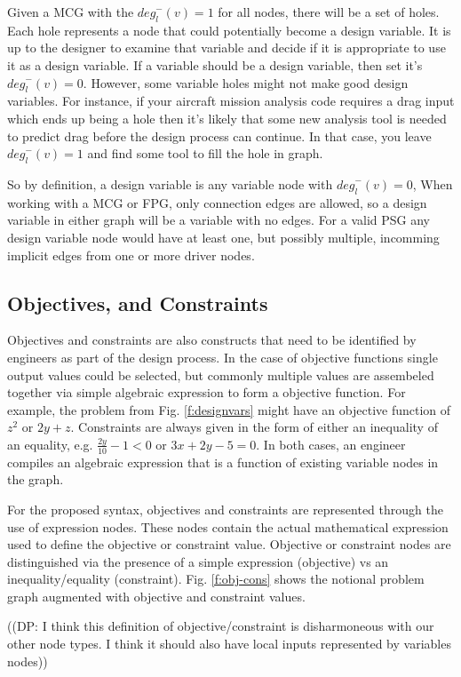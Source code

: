 Given a MCG with the ${deg}_l^-(v)=1$ for all nodes, there will be a set of holes. 
Each hole represents a node that could potentially become a design variable. 
It is up to the designer to examine that variable and decide if it is appropriate to 
use it as a design variable. If a variable should be a design variable, then 
set it's ${deg}_l^-(v)=0$. However, some variable holes might not make good design 
variables. For instance, if your aircraft mission analysis code requires a drag input 
which ends up being a hole then it's likely that some new analysis tool is needed
to predict drag before the design process can continue. In that case, you leave
${deg}_l^-(v)=1$ and find some tool to fill the hole in graph. 

So by definition, a design variable is any variable node with ${deg}_l^-(v)=0$, 
When working with a MCG or FPG, only connection edges are allowed, so a design 
variable in either graph will be a variable with no edges. For a valid PSG 
any design variable node would have at least one, but possibly multiple, incomming 
implicit edges from one or more driver nodes. 

\subsection{Objectives, and Constraints}
Objectives and constraints are also constructs that need to be identified by engineers 
as part of the design process. In the case of objective functions single output values 
could be selected, but commonly multiple values are assembeled together via simple 
algebraic expression to form a objective function. For example, the problem from 
Fig. \ref{f:designvars} might have an objective function of $z^2$ or $2y + z$. Constraints are 
always given in the form of either an inequality of an equality, e.g. 
$\frac{2y}{10}-1<0$ or $3x+2y - 5=0$. In both cases, an engineer compiles an
algebraic expression that is a function of existing variable nodes in the graph. 

For the proposed syntax, objectives and constraints are represented through the use of 
expression nodes. These nodes contain the actual mathematical expression used to define the 
objective or constraint value. Objective or constraint nodes are distinguished
via the presence of a simple expression (objective) vs an inequality/equality (constraint). 
Fig. \ref{f:obj-cons} shows the notional problem graph augmented with objective and 
constraint values. 

((DP: I think this definition of objective/constraint is disharmoneous with our other node types. I think it should also have local inputs represented by variables nodes))

